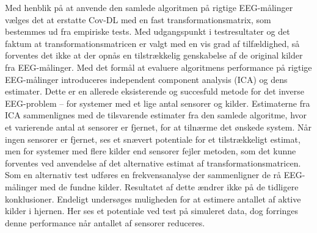 Med henblik på at anvende den samlede algoritmen på rigtige EEG-målinger vælges det at erstatte Cov-DL med en fast transformationsmatrix, som bestemmes ud fra empiriske tests. 
Med udgangspunkt i testresultater og det faktum at transformationsmatricen er valgt med en vis grad af tilfældighed, så forventes det ikke at der opnås en tilstrækkelig genskabelse af de original kilder fra EEG-målinger. 
Med det formål at evaluere algoritmens performance på rigtige EEG-målinger introduceres independent component analysis (ICA) og dens estimater. 
Dette er en allerede eksisterende og succesfuld metode for det inverse EEG-problem – for systemer med et lige antal sensorer og kilder. 
Estimaterne fra ICA sammenlignes med de tilsvarende estimater fra den samlede algoritme, hvor et varierende antal at sensorer er fjernet, for at tilnærme det ønskede system. 
Når ingen sensorer er fjernet, ses et snævert potentiale for et tilstrækkeligt estimat, men for systemer med flere kilder end sensorer fejler metoden, som det kunne forventes ved anvendelse af det alternative estimat af transformationsmatricen. 
Som en alternativ test udføres en frekvensanalyse der sammenligner de rå EEG-målinger med de fundne kilder. Resultatet af dette ændrer ikke på de tidligere konklusioner.
Endeligt undersøges muligheden for at estimere antallet af aktive kilder i hjernen. Her ses et potentiale ved test på simuleret data, dog forringes denne performance når antallet af sensorer reduceres.   
